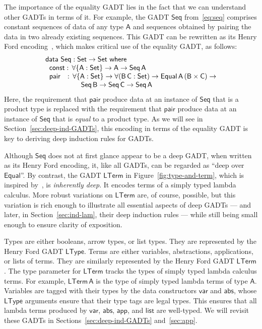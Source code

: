 \documentclass[sigplan,10pt,anonymous,review]{acmart}
\begin{document}
The importance of the equality GADT lies in the fact that we can
understand other GADTs in terms of it. For example, the GADT
$\mathsf{Seq}$ from~\eqref{eq:seq} comprises constant sequences of
data of any type $\mathsf{A}$ and sequences obtained by pairing the
data in two already existing sequences. This GADT can be rewritten as
its Henry Ford encoding~\cite{ch03,hin03,mcb99,sjsv09,sp04}, which
makes critical use of the equality GADT, as follows:
\begin{equation}\label{eq:eq_seq}
\begin{array}{l}
\mathsf{data\ Seq : Set \to Set\ where}\\
\mathsf{\;\;const :\, \forall \{A : Set\} \to A \to Seq\,A}\\ 
\mathsf{\;\;pair\,\;\; :\, \forall \{A : Set\} \to \forall (B\,C : Set) \to
  Equal\,A\,(B \times C) \to}\\
\mathsf{\hspace*{0.7in}Seq\,B \to Seq\,C \to Seq\,A}\\ 
\end{array}
\end{equation}
Here, the requirement that $\mathsf{pair}$ produce data at an instance
of $\mathsf{Seq}$ that is a product type is replaced with the
requirement that $\mathsf{pair}$ produce data at an instance of
$\mathsf{Seq}$ that is \emph{equal} to a product type. As we will see
in Section~\ref{sec:deep-ind-GADTs}, this encoding in terms of the
equality GADT is key to deriving deep induction rules for GADTs.

Although $\mathsf{Seq}$ does not at first glance appear to be a deep
GADT, when written as its Henry Ford encoding, it, like all GADTs, can
be regarded as ``deep over $\mathsf{Equal}$''.  By contrast, the
GADT $\mathsf{LTerm}$ in Figure~\ref{fig:type-and-term}, which is
inspired by~\cite{cis194}, is {\em inherently deep}.  It encodes terms
of a simply typed lambda calculus. More robust variations on
$\mathsf{LTerm}$ are, of course, possible, but this variation is rich
enough to illustrate all essential aspects of deep GADTs --- and
later, in Section~\ref{sec:ind-lam}, their deep induction rules ---
while still being small enough to ensure clarity of exposition.

Types are either booleans, arrow types, or list types. They are
represented by the Henry Ford GADT $\mathsf{LType}$.  Terms are either
variables, abstractions, applications, or lists of terms. They are
similarly represented by the Henry Ford GADT $\mathsf{LTerm}$.  The
type parameter for $\mathsf{LTerm}$ tracks the types of simply typed
lambda calculus terms. For example, $\mathsf{LTerm\,A}$ is the type of
simply typed lambda terms of type $\mathsf{A}$. Variables are tagged
with their types by the data constructors $\mathsf{var}$ and
$\mathsf{abs}$, whose $\mathsf{LType}$ arguments ensure that their
type tags are legal types. This ensures that all lambda terms produced
by $\mathsf{var}$, $\mathsf{abs}$, $\mathsf{app}$, and $\mathsf{list}$
are well-typed.  We will revisit these GADTs in
Sections~\ref{sec:deep-ind-GADTs} and~\ref{sec:app}.
\end{document}

